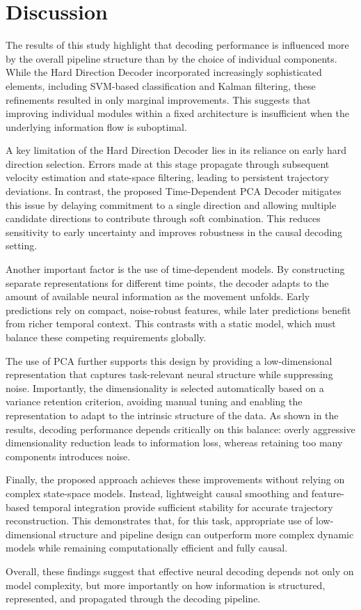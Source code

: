 \section{Discussion}

The results of this study highlight that decoding performance is influenced more by the overall pipeline structure than by the choice of individual components. While the Hard Direction Decoder incorporated increasingly sophisticated elements, including SVM-based classification and Kalman filtering, these refinements resulted in only marginal improvements. This suggests that improving individual modules within a fixed architecture is insufficient when the underlying information flow is suboptimal.

A key limitation of the Hard Direction Decoder lies in its reliance on early hard direction selection. Errors made at this stage propagate through subsequent velocity estimation and state-space filtering, leading to persistent trajectory deviations. In contrast, the proposed Time-Dependent PCA Decoder mitigates this issue by delaying commitment to a single direction and allowing multiple candidate directions to contribute through soft combination. This reduces sensitivity to early uncertainty and improves robustness in the causal decoding setting.

Another important factor is the use of time-dependent models. By constructing separate representations for different time points, the decoder adapts to the amount of available neural information as the movement unfolds. Early predictions rely on compact, noise-robust features, while later predictions benefit from richer temporal context. This contrasts with a static model, which must balance these competing requirements globally.

The use of PCA further supports this design by providing a low-dimensional representation that captures task-relevant neural structure while suppressing noise. Importantly, the dimensionality is selected automatically based on a variance retention criterion, avoiding manual tuning and enabling the representation to adapt to the intrinsic structure of the data. As shown in the results, decoding performance depends critically on this balance: overly aggressive dimensionality reduction leads to information loss, whereas retaining too many components introduces noise.

Finally, the proposed approach achieves these improvements without relying on complex state-space models. Instead, lightweight causal smoothing and feature-based temporal integration provide sufficient stability for accurate trajectory reconstruction. This demonstrates that, for this task, appropriate use of low-dimensional structure and pipeline design can outperform more complex dynamic models while remaining computationally efficient and fully causal.

Overall, these findings suggest that effective neural decoding depends not only on model complexity, but more importantly on how information is structured, represented, and propagated through the decoding pipeline.